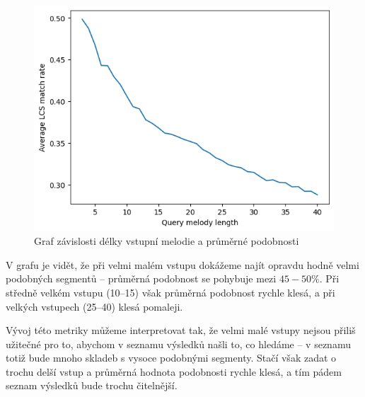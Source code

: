 \begin{figure}[!ht]
    \caption{Graf závislosti délky vstupní melodie a průměrné podobnosti}
    \centering
    \includegraphics[width=\textwidth]{images/lcs_match_rate.png}
\end{figure}

V grafu je vidět, že při velmi malém vstupu dokážeme najít opravdu hodně velmi podobných segmentů -- průměrná podobnost se pohybuje mezi $45-50 \%$. Při středně velkém vstupu (10--15) však průměrná podobnost rychle klesá, a při velkých vstupech (25--40) klesá pomaleji.

Vývoj této metriky můžeme interpretovat tak, že velmi malé vstupy nejsou přiliš užitečné pro to, abychom v seznamu výsledků našli to, co hledáme -- v seznamu totiž bude mnoho skladeb s vysoce podobnými segmenty. Stačí však zadat o trochu delší vstup a průměrná hodnota podobnosti rychle klesá, a tím pádem seznam výsledků bude trochu čitelnější.
